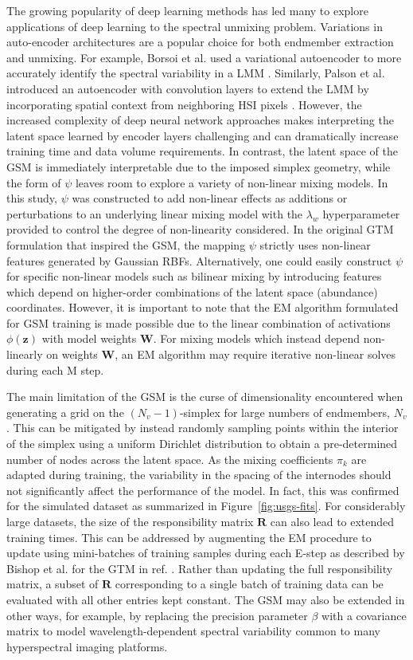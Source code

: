 The growing popularity of deep learning methods has led many to explore
applications of deep learning to the spectral unmixing problem. Variations in
auto-encoder architectures are a popular choice for both endmember extraction
and unmixing. For example, Borsoi et al. used a variational autoencoder to more
accurately identify the spectral variability in a LMM \cite{borsoi2019deep}.
Similarly, Palson et al. introduced an autoencoder with convolution layers to
extend the LMM by incorporating spatial context from neighboring HSI pixels
\cite{palsson2020convolutional}. However, the increased complexity of deep
neural network approaches makes interpreting the latent space learned by encoder
layers challenging and can dramatically increase training time and data volume
requirements. In contrast, the latent space of the GSM is immediately
interpretable due to the imposed simplex geometry, while the form of $\psi$
leaves room to explore a variety of non-linear mixing models. In this study,
$\psi$ was constructed to add non-linear effects as additions or perturbations
to an underlying linear mixing model with the $\lambda_w$ hyperparameter
provided to control the degree of non-linearity considered. In the original GTM
formulation that inspired the GSM, the mapping $\psi$ strictly uses non-linear
features generated by Gaussian RBFs. Alternatively, one could easily construct
$\psi$ for specific non-linear models such as bilinear mixing by introducing
features which depend on higher-order combinations of the latent space
(abundance) coordinates. However, it is important to note that the EM algorithm
formulated for GSM training is made possible due to the linear combination of
activations $\phi(\mathbf{z})$ with model weights $\mathbf{W}$. For mixing
models which instead depend non-linearly on weights $\mathbf{W}$, an EM
algorithm may require iterative non-linear solves during each M step.


The main limitation of the GSM is the curse of dimensionality encountered when
generating a grid on the $(N_v-1)$-simplex for large numbers of endmembers,
$N_v$. This can be mitigated by instead randomly sampling points within the
interior of the simplex using a uniform Dirichlet distribution to obtain a
pre-determined number of nodes across the latent space. As the mixing
coefficients $\pi_k$ are adapted during training, the variability in the spacing
of the internodes should not significantly affect the performance of the model.
In fact, this was confirmed for the simulated dataset as summarized in
Figure~\ref{fig:usgs-fits}. For considerably large datasets, the size of the
responsibility matrix $\mathbf{R}$ can also lead to extended training times.
This can be addressed by augmenting the EM procedure to update using
mini-batches of training samples during each E-step as described by Bishop et
al. for the GTM in ref. \cite{gtm-developments}. Rather than updating the full
responsibility matrix, a subset of $\mathbf{R}$ corresponding to a single batch
of training data can be evaluated with all other entries kept constant. The GSM
may also be extended in other ways, for example, by replacing the precision
parameter $\beta$ with a covariance matrix to model wavelength-dependent
spectral variability common to many hyperspectral imaging platforms.



